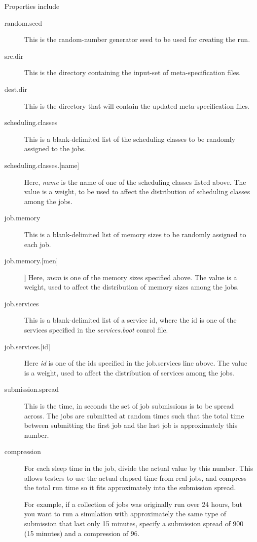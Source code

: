      Properties include
     \begin{description}
       \item[random.seed] This is the random-number generator seed to be used for
         creating the run.
       \item[src.dir] This is the directory containing the input-set of meta-specification
         files.
       \item[dest.dir] This is the directory that will contain the updated meta-specification
         files.
       \item[scheduling.classes] This is a blank-delimited list of the scheduling classes to
         be randomly assigned to the jobs.  
       \item[scheduling.classes.{[name]}] Here, {\em name} is the name of one of the 
         scheduling classes listed above.  The value is a weight, to be used to affect
         the distribution of scheduling classes among the jobs.
       \item[job.memory] This is a blank-delimited list of memory sizes to be randomly
         assigned to each job.
       \item[job.memory.{[men]}]] Here, {\em mem} is one of the memory sizes specified
         above.  The value is a weight, used to affect the distribution of memory sizes
         among the jobs.
       \item[job.services] This is a blank-delimited list of a service id, where the id
         is one of the services specified in the {\em services.boot} conrol file.
       \item[job.services.{[id]}] Here {\em id} is one of the ids specified in the
         job.services line above.  The value is a weight, used to affect the distribution
         of services among the jobs.

       \item[submission.spread]  This is the time, in seconds the set of job submissions
         is to be spread across.  The jobs are submitted at random times such that the
         total time between submitting the first job and the last job is approximately
         this number.
       \item[compression] For each sleep time in the job, divide the actual value by 
         this number.  This allows testers to use the actual elapsed time from real
         jobs, and compress the total run time so it fits approximately into the submission
         spread.

         For example, if a collection of jobs was originally run over 24 hours, but 
         you want to run a simulation with approximately the same type of submission
         that last only 15 minutes, specify a submission spread of 900 (15 minutes) and
         a compression of 96.
     \end{description}

